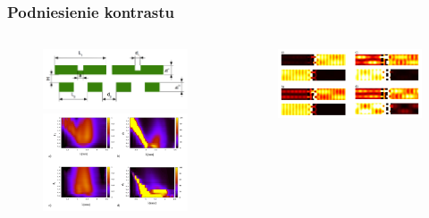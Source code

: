 \documentclass{beamer}
\begin{document}
\begin{frame}
\begin{columns}
\begin{column}{0.5\textwidth}
		\end{column}
	\end{columns}
		
\end{frame}

\begin{frame}
	\frametitle{Podniesienie kontrastu}
	\begin{columns}
		\begin{column}{0.5\textwidth}
			\begin{figure}
				\includegraphics[width=\textwidth]{../images/dmg/kontrast_schemat.png}\\
				\includegraphics[width=\textwidth]{../images/dmg/kontrast_maps.png}\\
			\end{figure}
		\end{column}
		\begin{column}{0.5\textwidth}
			\begin{figure}
				\includegraphics[width=\textwidth]{../images/dmg/kontrast_energy.png}\\

\end{figure}
\end{column}
\end{columns}
\end{frame}
\end{document}

